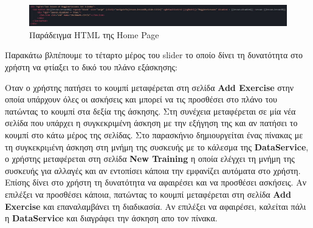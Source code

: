 \documentclass[a4paper,12pt]{article}
\begin{document}
			\vspace*{1cm}

			\begin{figure}[!htb]
				\begin{center}
					\caption{Παράδειγμα HTML της Home Page}
					\vspace*{0.5cm}

					\includegraphics[width=\linewidth]{homeHtml} 
				\end{center}
			\end{figure}

			Παρακάτω βλπέπουμε το τέταρτο μέρος του slider το οποίο δίνει τη δυνατότητα στο χρήστη να φτίαξει το δικό του πλάνο εξάσκησης:
			
			\newpage
			Οταν ο χρήστης πατήσει το κουμπί μεταφέρεται στη σελίδα \textbf{Add Exercise} στην οποία υπάρχουν όλες οι ασκήσεις και μπορεί να τις προσθέσει 
			στο πλάνο του πατώντας το κουμπί στα δεξία της άσκησης. Στη συνέχεια μεταφέρεται σε μία νέα σελίδα που υπάρχει η συγκεκριμένη άσκηση με την εξήγηση της και αν πατήσει το κουμπί
			στο κάτω μέρος της σελίδας. Στο παρασκήνιο δημιουργείται ένας πίνακας με τη συγκεκριµένη άσκηση στη μνήμη της συσκευής με το κάλεσμα της \textbf{DataService},
			ο χρήστης μεταφέρεται στη σελίδα \textbf{New Training}
			η οποία ελέγχει τη μνήμη της συσκευής για αλλαγές και αν εντοπίσει κάποια την εμφανίζει αυτόματα στο χρήστη. Επίσης
			δίνει στο χρήστη τη δυνατότητα να αφαιρέσει και να προσθέσει ασκήσεις. Αν επιλέξει να προσθέσει κάποια, πατώντας το κουμπί
			μεταφέρεται στη σελίδα \textbf{Add Exercise} και επαναλαμβάνει τη διαδικασία. Αν επιλέξει να αφαιρέσει, καλείται πάλι 
			η \textbf{DataService} και διαγράφει την άσκηση απο τον πίνακα.
			
			\vspace*{1cm}
\end{document}
